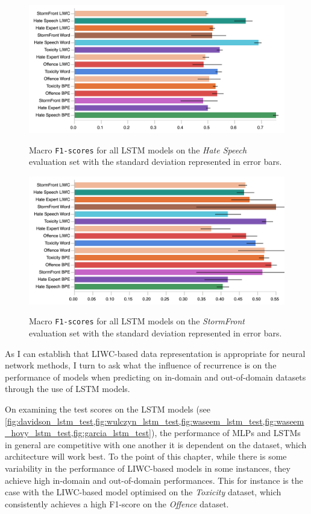 \begin{figure}  
\begin{minipage}{\textwidth}  
    \centering  
    \includegraphics[width=\textwidth]{all_lstm_waseem_hovy_test.pdf}  
    \caption{Macro \texttt{F1-scores} for all LSTM models on the \textit{Hate Speech} evaluation set with the standard deviation represented in error bars.}  
  \label{fig:waseem_hovy_lstm_test}    
  \vfill  
    \includegraphics[width=\textwidth]{all_lstm_garcia_test.pdf}  
  \caption{Macro \texttt{F1-scores} for all LSTM models on the \textit{StormFront} evaluation set with the standard deviation represented in error bars.}  
  \label{fig:garcia_lstm_test}  
\end{minipage}  
\end{figure}  
  
As I can establish that LIWC-based data representation is appropriate for  neural network methods, I turn to ask what the influence of recurrence is on the performance of models when predicting on in-domain and out-of-domain datasets through the use of LSTM models.  
  
On examining the test scores on the LSTM models (see \cref{fig:davidson_lstm_test,fig:wulczyn_lstm_test,fig:waseem_lstm_test,fig:waseem_hovy_lstm_test,fig:garcia_lstm_test}),  the performance of MLPs and LSTMs in general are competitive with one another  it is dependent on the dataset, which  architecture will work best.  
To the point of this chapter, while there is some variability in the performance of LIWC-based models in some instances, they achieve high in-domain and out-of-domain performances.  
This for instance is the case with the LIWC-based model optimised on the \textit{Toxicity} dataset, which consistently achieves a high F1-score on the \textit{Offence} dataset.  
  
